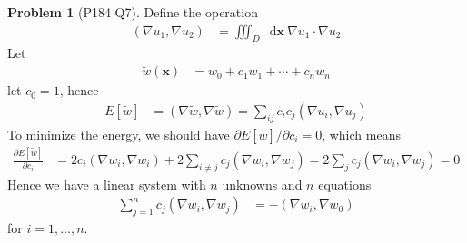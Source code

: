 \documentclass[twoside,11pt]{article}
\renewcommand*\d{\mathop{}\!\mathrm{d}}
\theoremstyle{definition}
\newtheorem{problem}{Problem}
\theoremstyle{remark}
\begin{document}






\begin{problem}[P184 Q7]
Define the operation
\begin{align*}
    (\nabla u_1, \nabla u_2) &= 
    \iiint_D\d\mathbf{x}\ \nabla u_1\cdot \nabla u_2
\end{align*}
Let
\begin{align*}
    \tilde{w}(\mathbf{x}) &= 
    w_0 + c_1w_1 + \cdots + c_nw_n
\end{align*}
let $c_0=1$, hence 
\begin{align*}
    E[\tilde{w}] &= 
    (\nabla \tilde{w}, \nabla\tilde{w})
    = \sum_{ij}c_i c_j(\nabla u_i, \nabla u_j)
\end{align*}
To minimize the energy, we should have $\partial E[\tilde{w}]/\partial c_i=0$,
which means
\begin{align*}
    \frac{\partial E[\tilde{w}]}{\partial c_i} &= 
    2c_i(\nabla w_i, \nabla w_i) + 2\sum_{i\neq j} c_j(\nabla w_i, \nabla w_j)
    = 2\sum_{j}c_j(\nabla w_i, \nabla w_j) = 0
\end{align*}
Hence we have a linear system with $n$ unknowns and $n$ equations
\begin{align*}
    \sum_{j=1}^n c_j(\nabla w_i, \nabla w_j) &= -(\nabla w_i, \nabla w_0)
\end{align*}
for $i=1,\dots,n$.
\end{problem}
\end{document}
